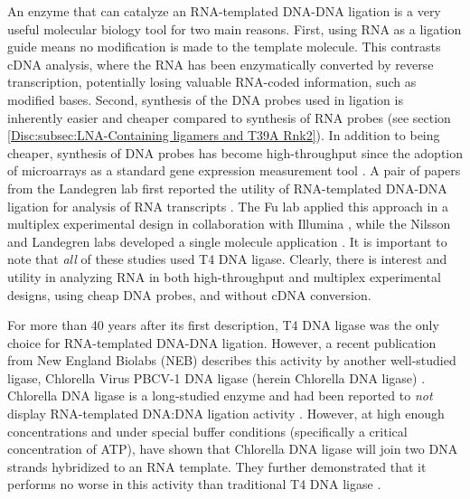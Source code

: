     An enzyme that can catalyze an RNA-templated DNA-DNA ligation is a very useful molecular biology tool for two main reasons. First, using RNA as a ligation guide means no modification is made to the template molecule. This contrasts cDNA analysis, where the RNA has been enzymatically converted by reverse transcription, potentially losing valuable RNA-coded information, such as modified bases. Second, synthesis of the DNA probes used in ligation is inherently easier and cheaper compared to synthesis of RNA probes (see section \ref{Disc:subsec:LNA-Containing ligamers and T39A Rnk2}). In addition to being cheaper, synthesis of DNA probes has become high-throughput since the adoption of microarrays as a standard gene expression measurement tool \citep{Schena1995a}. A pair of papers from the Landegren lab first reported the utility of RNA-templated DNA-DNA ligation for analysis of RNA transcripts \citep{Nilsson2000,Nilsson2001}. The Fu lab applied this approach in a multiplex experimental design in collaboration with Illumina \citep{Li2012c,Yeakley2002}, while the Nilsson and Landegren labs developed a single molecule application \citep{Conze2010}. It is important to note that \textit{all} of these studies used T4 DNA ligase. Clearly, there is interest and utility in analyzing RNA in both high-throughput and multiplex experimental designs, using cheap DNA probes, and without cDNA conversion.

    For more than 40 years after its first description, T4 DNA ligase was the only choice for RNA-templated DNA-DNA ligation. However, a recent publication from New England Biolabs (NEB) describes this activity by another well-studied ligase, Chlorella Virus PBCV-1 DNA ligase (herein Chlorella DNA ligase) \citep{Lohman2013c}. Chlorella DNA ligase is a long-studied enzyme and had been reported to \textit{not} display RNA-templated DNA:DNA ligation activity \citep{Ho1997b,Sriskanda1998c}. However, at high enough concentrations and under special buffer conditions (specifically a critical concentration of ATP), \citet{Lohman2013c} have shown that Chlorella DNA ligase will join two DNA strands hybridized to an RNA template. They further demonstrated that it performs no worse in this activity than traditional T4 DNA ligase \citep{Nilsson2001,Yeakley2002}.


